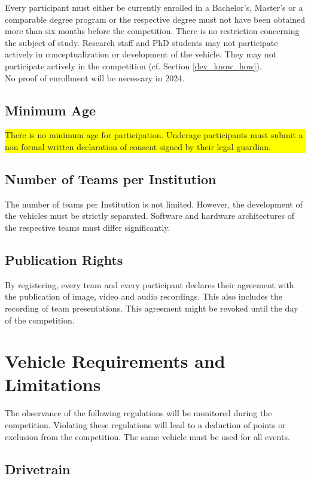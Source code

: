 \documentclass[a4paper]{report}
\newlength\colorboxwidth
\begin{document}
Every participant must either be currently enrolled in a Bachelor’s, Master’s
or a comparable degree program or the respective degree must not have been
obtained more than six months before the competition. There is no restriction
concerning the subject of study. Research staff and PhD students may not
participate actively in conceptualization or development of the vehicle. They
may not participate actively in the competition (cf. Section
\ref{dev_know_how}).\\ No proof of enrollment will be necessary in 2024.

\section{Minimum Age}

\colorbox{yellow}{\parbox{\colorboxwidth}{There is no minimum age for participation. Underage participants must submit a non formal written declaration of consent signed by their legal guardian.}}

\section{Number of Teams per Institution}

The number of teams per Institution is not limited. However, the development of
the vehicles must be strictly separated. Software and hardware architectures of
the respective teams must differ significantly.

\section{Publication Rights}

By registering, every team and every participant declares their agreement with
the publication of image, video and audio recordings. This also includes the
recording of team presentations. This agreement might be revoked until the day
of the competition.

\chapter{Vehicle Requirements and Limitations}

The observance of the following regulations will be monitored during the
competition. Violating these regulations will lead to a deduction of points or
exclusion from the competition. The same vehicle must be used for all events.

\section{Drivetrain}
\end{document}
